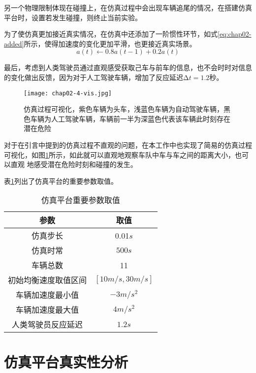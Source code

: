 另一个物理限制体现在碰撞上，在仿真过程中会出现车辆追尾的情况，在搭建仿真平台时，设置若发生碰撞，则终止当前实验。

为了使仿真更加接近真实情况，在仿真中还添加了一阶惯性环节，如式\ref{eq:chap02-added}所示，使得加速度的变化更加平滑，也更接近真实场景。
\begin{equation}
  a(t) \leftarrow 0.8a(t-1) + 0.2a(t)
  \label{eq:chap02-added}
\end{equation}

最后，考虑到人类驾驶员通过直观感受获取己车与前车的信息，也不会时时对信息的变化做出反馈，因为对于人工驾驶车辆，增加了反应延迟$\increment{t} = 1.2$秒。

\begin{figure}
  \centering
  \texttt{[image: chap02-4-vis.jpg]}
  \caption{仿真过程可视化，紫色车辆为头车，浅蓝色车辆为自动驾驶车辆，黑色车辆为人工驾驶车辆，车辆前一半为深蓝色代表该车辆此时刻存在潜在危险}
  \label{fig:chap02-4-vis}
\end{figure}

对于在引言中提到的仿真过程不直观的问题，在本工作中也实现了简易的仿真过程可视化，如图\ref{fig:chap02-4-vis}所示，如此就可以直观地观察车队中车与车之间的距离大小，也可以直观
地感受潜在危险时刻和碰撞的发生。

表\ref{tab:chap02-3}列出了仿真平台的重要参数取值。

\begin{table}
  \centering
  \caption{仿真平台重要参数取值}
  \begin{tabular}{cc}
    \toprule
    参数                   &  取值                         \\
    \midrule
    仿真步长                & 0.01$s$         \\
    仿真时常                & $500s$             \\
    车辆总数                & 11              \\
    初始均衡速度取值区间      & $[10m/s, 30m/s]$        \\
    车辆加速度最小值         & $-3m/s^2$     \\
    车辆加速度最大值         & $4m/s^2$ \\
    人类驾驶员反应延迟       & $1.2s$ \\
    \bottomrule
  \end{tabular}
  \label{tab:chap02-3}
\end{table}

\section{仿真平台真实性分析}

